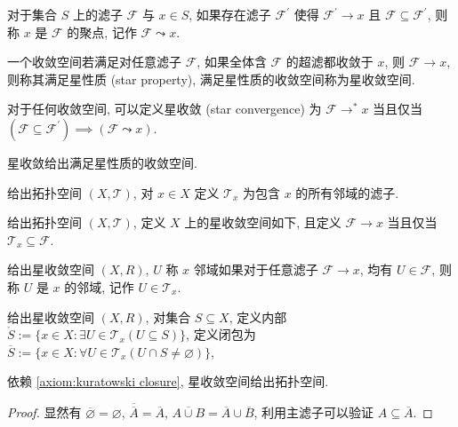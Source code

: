 \begin{definition}[聚点]
    对于集合 \(S\) 上的滤子 \(\mathcal{F}\) 与 \(x \in S\), 如果存在滤子 \(\mathcal{F}^\prime\) 使得 \(\mathcal{F}^\prime \to x\) 且 \(\mathcal{F} \subseteq \mathcal{F}^\prime\), 
    则称 \(x\) 是 \(\mathcal{F}\) 的聚点, 记作 \(\mathcal{F} \leadsto x\).
\end{definition}

\begin{definition}[星性质]
    一个收敛空间若满足对任意滤子 \(\mathcal{F}\), 如果全体含 \(\mathcal{F}\) 的超滤都收敛于 \(x\),
    则 \(\mathcal{F} \to x\), 则称其满足星性质 (star property), 满足星性质的收敛空间称为星收敛空间.
\end{definition}

\begin{corollary}
    对于任何收敛空间, 可以定义星收敛 (star convergence) 为 \(\mathcal{F} \to^{*} x\) 当且仅当 \((\mathcal{F} \subseteq \mathcal{F}^\prime) \implies (\mathcal{F} \leadsto x)\).

    星收敛给出满足星性质的收敛空间.
\end{corollary}

\begin{definition}
    给出拓扑空间 \((X,\mathcal{T})\), 对 \(x \in X\) 定义 \(\mathcal{T}_x\) 为包含 \(x\) 的所有邻域的滤子.
\end{definition}

\begin{definition}
    给出拓扑空间 \((X,\mathcal{T})\), 定义 \(X\) 上的星收敛空间如下, 且定义 \(\mathcal{F} \to x\) 当且仅当 \(\mathcal{T}_x \subseteq \mathcal{F}\).
\end{definition}

\begin{definition}
    给出星收敛空间 \((X,R)\), \(U\) 称 \(x\) 邻域如果对于任意滤子 \(\mathcal{F} \to x\), 均有 \(U \in \mathcal{F}\),
    则称 \(U\) 是 \(x\) 的邻域, 记作 \(U \in \mathcal{T}_x\).
\end{definition}

\begin{definition}
    给出星收敛空间 \((X,R)\), 对集合 \(S \subseteq X\), 定义内部 \(\mathring{S} := \{x \in X : \exists U \in \mathcal{T}_x (U \subseteq S)\}\),
    定义闭包为 \(\overline{S} := \{x \in X : \forall U \in \mathcal{T}_x (U \cap S \neq \varnothing)\}\),
\end{definition}

\begin{definition}
    依赖 \ref{axiom:kuratowski closure}, 星收敛空间给出拓扑空间.

    \begin{proof}
        显然有 \(\overline{\varnothing} = \varnothing\), \(\overline{\overline{A}} = \overline{A}\),
        \(\overline{A \cup B} = \overline{A} \cup \overline{B}\), 利用主滤子可以验证 \(A \subseteq \overline{A}\).
    \end{proof}
\end{definition}

